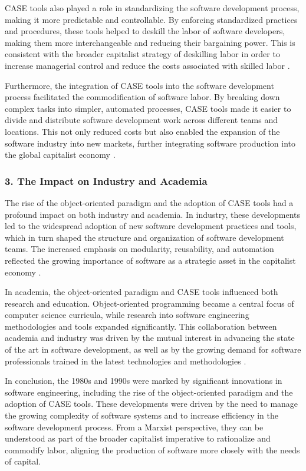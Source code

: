 \begin{refsection}
\begin{multicols}{2}
{CASE tools also played a role in standardizing the software development process, making it more predictable and controllable. By enforcing standardized practices and procedures, these tools helped to deskill the labor of software developers, making them more interchangeable and reducing their bargaining power. This is consistent with the broader capitalist strategy of deskilling labor in order to increase managerial control and reduce the costs associated with skilled labor \cite{braverman1974labor}.

Furthermore, the integration of CASE tools into the software development process facilitated the commodification of software labor. By breaking down complex tasks into simpler, automated processes, CASE tools made it easier to divide and distribute software development work across different teams and locations. This not only reduced costs but also enabled the expansion of the software industry into new markets, further integrating software production into the global capitalist economy \cite{fuchs2014digital}.

\subsubsection*{3. The Impact on Industry and Academia}

The rise of the object-oriented paradigm and the adoption of CASE tools had a profound impact on both industry and academia. In industry, these developments led to the widespread adoption of new software development practices and tools, which in turn shaped the structure and organization of software development teams. The increased emphasis on modularity, reusability, and automation reflected the growing importance of software as a strategic asset in the capitalist economy \cite{harvey1989condition}.

In academia, the object-oriented paradigm and CASE tools influenced both research and education. Object-oriented programming became a central focus of computer science curricula, while research into software engineering methodologies and tools expanded significantly. This collaboration between academia and industry was driven by the mutual interest in advancing the state of the art in software development, as well as by the growing demand for software professionals trained in the latest technologies and methodologies \cite{fuchs2014digital}.

In conclusion, the 1980s and 1990s were marked by significant innovations in software engineering, including the rise of the object-oriented paradigm and the adoption of CASE tools. These developments were driven by the need to manage the growing complexity of software systems and to increase efficiency in the software development process. From a Marxist perspective, they can be understood as part of the broader capitalist imperative to rationalize and commodify labor, aligning the production of software more closely with the needs of capital.

}
\end{multicols}
\end{refsection}
